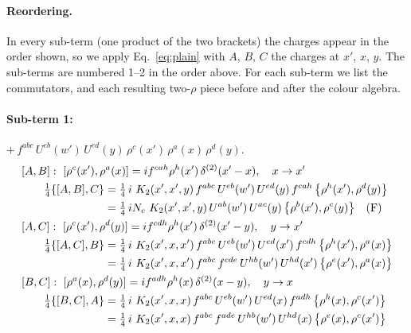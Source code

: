 \documentclass[10pt]{article}
\numberwithin{equation}{section}
\begin{document}
\paragraph{Reordering.} In every sub-term (one product of the two brackets) the charges appear in the order shown, so we apply Eq.~\eqref{eq:plain} with $A$, $B$, $C$ the charges at $x'$, $x$, $y$. The sub-terms are numbered 1--2 in the order above. For each sub-term we list the commutators, and each resulting two-$\rho$ piece before and after the colour algebra.
\paragraph{Sub-term 1:} $+\,f^{abc}\,U^{eb}(w')\,U^{ed}(y)\,\rho^{c}(x')\,\rho^{a}(x)\,\rho^{d}(y)$.
\begin{align}
&[A,B]:\ [\rho^{c}(x'),\rho^{a}(x)]=i f^{cah}\rho^{h}(x')\,\delta^{(2)}(x'-x),\quad x\to x'\notag\\
&\qquad \tfrac14\{[A,B],C\}=\tfrac14\,i\,\,K_2(x',x',y)\,f^{abc}\,U^{eb}(w')\,U^{ed}(y)\,f^{cah}\,\big\{\rho^{h}(x'),\rho^{d}(y)\big\}\notag\\
&\qquad\phantom{\tfrac14\{[A,B],C\}}=\tfrac14\,i N_{c}\,\,K_2(x',x',y)\,U^{ab}(w')\,U^{ac}(y)\,\big\{\rho^{b}(x'),\rho^{c}(y)\big\}\quad\text{(F)}
\label{eq:A2-1-AB}\\
&[A,C]:\ [\rho^{c}(x'),\rho^{d}(y)]=i f^{cdh}\rho^{h}(x')\,\delta^{(2)}(x'-y),\quad y\to x'\notag\\
&\qquad \tfrac14\{[A,C],B\}=\tfrac14\,i\,\,K_2(x',x,x')\,f^{abc}\,U^{eb}(w')\,U^{ed}(x')\,f^{cdh}\,\big\{\rho^{h}(x'),\rho^{a}(x)\big\}\notag\\
&\qquad\phantom{\tfrac14\{[A,C],B\}}=\tfrac14\,i\,\,K_2(x',x,x')\,f^{abc}\,f^{cde}\,U^{hb}(w')\,U^{hd}(x')\,\big\{\rho^{e}(x'),\rho^{a}(x)\big\}
\label{eq:A2-1-AC}\\
&[B,C]:\ [\rho^{a}(x),\rho^{d}(y)]=i f^{adh}\rho^{h}(x)\,\delta^{(2)}(x-y),\quad y\to x\notag\\
&\qquad \tfrac14\{[B,C],A\}=\tfrac14\,i\,\,K_2(x',x,x)\,f^{abc}\,U^{eb}(w')\,U^{ed}(x)\,f^{adh}\,\big\{\rho^{h}(x),\rho^{c}(x')\big\}\notag\\
&\qquad\phantom{\tfrac14\{[B,C],A\}}=\tfrac14\,i\,\,K_2(x',x,x)\,f^{abc}\,f^{ade}\,U^{hb}(w')\,U^{hd}(x)\,\big\{\rho^{e}(x),\rho^{c}(x')\big\}
\label{eq:A2-1-BC}
\end{align}
\end{document}
